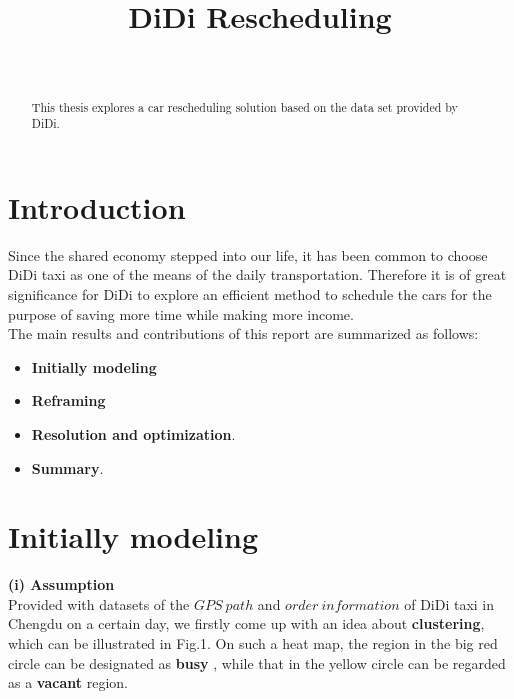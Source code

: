 \documentclass[10pt,journal]{IEEEtran}
\begin{document}
\title{DiDi Rescheduling}

\author{    \\
} 
\maketitle

\begin{abstract}

This thesis explores a car rescheduling solution based on the data set provided by DiDi.
 
\end{abstract}


\section{Introduction}

Since the shared economy stepped into our life, it has been common to choose DiDi taxi as one of the means of the daily transportation. 
Therefore it is of great significance for DiDi to explore an efficient method to schedule the cars for the purpose of saving more time while making more income.\\

The main results and contributions of this report are summarized as follows:
\begin{itemize}
  \item \textbf{Initially modeling} 
  \item \textbf{Reframing}
  \item \textbf{Resolution and optimization}. 
  \item \textbf{Summary}.  
\end{itemize}


\section{Initially modeling}
\textbf{(i) Assumption}\\

Provided with datasets of the $GPS\ path$ and $order\ information$ of DiDi taxi in Chengdu on a certain day, we firstly come up with an idea about \textbf{clustering}, which can be illustrated in Fig.1. On such a heat map, the region in the big red circle can be designated as \textbf{busy} , while that in the yellow circle can be regarded as a \textbf{vacant} region. \\
\end{document}
